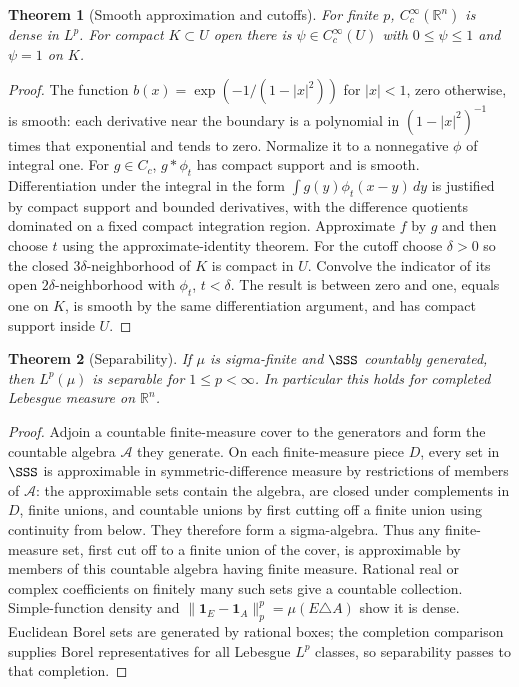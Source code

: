 \documentclass[11pt,oneside,openany]{book}
\newtheorem{theorem}{Theorem}[chapter]
\theoremstyle{definition}
\theoremstyle{remark}
\newcommand{\R}{\mathbb R}\newcommand{\C}{\mathbb C}
\newcommand{\one}{\mathbf1}\newcommand{\ind}[1]{\mathbf1_{#1}}
\newcommand{\family}[1]{}
\begin{document}
\begin{theorem}[Smooth approximation and cutoffs]\family{D11.11.smooth_density}\label{d11:11:smooth-density}
For finite $p$, $C_c^\infty(\R^n)$ is dense in $L^p$.
For compact $K\subset U$ open there is $\psi\in C_c^\infty(U)$ with
$0\leq\psi\leq1$ and $\psi=1$ on $K$.
\end{theorem}
\begin{proof}
The function $b(x)=\exp(-1/(1-|x|^2))$ for $|x|<1$, zero otherwise,
is smooth: each derivative near the boundary is a polynomial in
$(1-|x|^2)^{-1}$ times that exponential and tends to zero. Normalize it
to a nonnegative $\phi$ of integral one. For $g\in C_c$, $g*\phi_t$ has
compact support and is smooth. Differentiation under the integral in the
form $\int g(y)\phi_t(x-y)\,dy$ is justified by compact support and
bounded derivatives, with the difference quotients dominated on a fixed
compact integration region. Approximate $f$ by $g$ and then choose $t$
using the approximate-identity theorem.
For the cutoff choose $\delta>0$ so the closed $3\delta$-neighborhood
of $K$ is compact in $U$. Convolve the indicator of its open
$2\delta$-neighborhood with $\phi_t$, $t<\delta$. The result is between
zero and one, equals one on $K$, is smooth by the same differentiation
argument, and has compact support inside $U$.
\end{proof}

\begin{theorem}[Separability]\family{D11.11.finite_p_separability}\label{d11:11:finite-p-separability}
If $\mu$ is sigma-finite and $\SSS$ countably generated, then $L^p(\mu)$
is separable for $1\leq p<\infty$. In particular this holds for completed
Lebesgue measure on $\R^n$.
\end{theorem}
\begin{proof}
Adjoin a countable finite-measure cover to the generators and form the
countable algebra $\mathcal A$ they generate. On each finite-measure piece
$D$, every set in $\SSS$ is approximable in symmetric-difference measure
by restrictions of members of $\mathcal A$: the approximable sets contain
the algebra, are closed under complements in $D$, finite unions, and
countable unions by first cutting off a finite union using continuity from
below. They therefore form a sigma-algebra. Thus any finite-measure set,
first cut off to a finite union of the cover, is approximable by members
of this countable algebra having finite measure. Rational real or complex
coefficients on finitely many such sets give a countable collection.
Simple-function density and $\|\one_E-\one_A\|_p^p=\mu(E\triangle A)$
show it is dense. Euclidean Borel sets are generated by rational boxes;
the completion comparison supplies Borel representatives for all Lebesgue
$L^p$ classes, so separability passes to that completion.
\end{proof}
\end{document}
